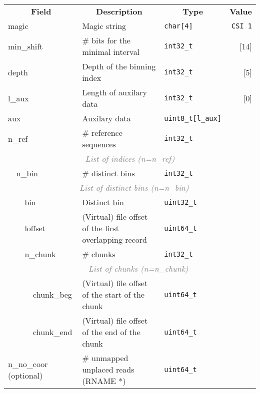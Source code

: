 \documentclass[10pt]{article}
\begin{document}
\begin{table}[h]
{\small
\begin{tabular}{|l|l|l|l|l|l|r|}
  \cline{1-7}
  \multicolumn{4}{|c|}{\bf Field} & \multicolumn{1}{c|}{\bf Description} & \multicolumn{1}{c|}{\bf Type} & \multicolumn{1}{c|}{\bf Value} \\\cline{1-7}
  \multicolumn{4}{|l|}{\sf magic} & Magic string & {\tt char[4]} & {\tt CSI\char92 1}\\\cline{1-7}
  \multicolumn{4}{|l|}{\sf min\_shift} & \# bits for the minimal interval & {\tt int32\_t} & [14]\\\cline{1-7}
  \multicolumn{4}{|l|}{\sf depth} & Depth of the binning index & {\tt int32\_t} & [5]\\\cline{1-7}
  \multicolumn{4}{|l|}{\sf l\_aux} & Length of auxilary data & {\tt int32\_t} & [0]\\\cline{1-7}
  \multicolumn{4}{|l|}{\sf aux} & Auxilary data & {\tt uint8\_t[l\_aux]} & \\\cline{1-7}
  \multicolumn{4}{|l|}{\sf n\_ref} & \# reference sequences & {\tt int32\_t} & \\\cline{1-7}
  \multicolumn{7}{|c|}{\textcolor{gray}{\it List of indices (n=n\_ref)}} \\\cline{2-7}
  & \multicolumn{3}{l|}{\sf n\_bin} & \# distinct bins & {\tt int32\_t} & \\\cline{2-7}
  & \multicolumn{6}{c|}{\textcolor{gray}{\it List of distinct bins (n=n\_bin)}} \\\cline{3-7}
  & & \multicolumn{2}{l|}{\sf bin} & Distinct bin & {\tt uint32\_t} & \\\cline{3-7}
  & & \multicolumn{2}{l|}{\sf loffset} & (Virtual) file offset of the first overlapping record & {\tt uint64\_t} & \\\cline{3-7}
  & & \multicolumn{2}{l|}{\sf n\_chunk} & \# chunks & {\tt int32\_t} & \\\cline{3-7}
  & & \multicolumn{5}{c|}{\textcolor{gray}{\it List of chunks (n=n\_chunk)}} \\\cline{4-7}
  & & & {\sf chunk\_beg} & (Virtual) file offset of the start of the chunk & {\tt uint64\_t} & \\\cline{4-7}
  & & & {\sf chunk\_end} & (Virtual) file offset of the end of the chunk & {\tt uint64\_t} & \\\cline{1-7}
  \multicolumn{4}{|l|}{{\sf n\_no\_coor} (optional)} & \# unmapped unplaced reads ({\sf RNAME} *) & {\tt uint64\_t} & \\\cline{1-7}
\end{tabular}}
\end{table}
\end{document}
